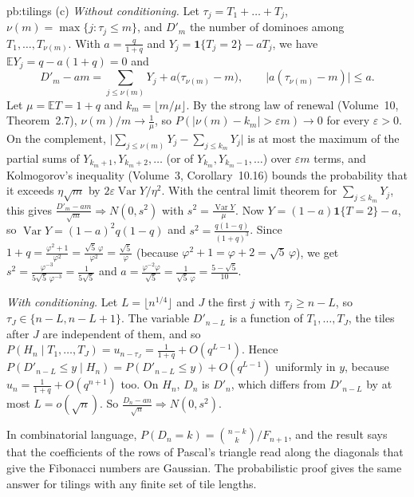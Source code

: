 \begin{solution}{pb:tilings}
(c) \emph{Without conditioning.} Let $\tau_j=T_1+\dots+T_j$, $\nu(m)=\max\{j:\tau_j\le m\}$, and $D'_m$ the number of dominoes among $T_1,\dots,T_{\nu(m)}$. With
$a=\frac q{1+q}$ and $Y_j=\mathbf 1\{T_j=2\}-aT_j$, we have $\mathbb EY_j=q-a(1+q)=0$ and
\[
D'_m-am=\sum_{j\le\nu(m)}Y_j+a\bigl(\tau_{\nu(m)}-m\bigr),\qquad\bigl|a(\tau_{\nu(m)}-m)\bigr|\le a.
\]
Let $\mu=\mathbb ET=1+q$ and $k_m=\lfloor m/\mu\rfloor$. By the strong law of renewal (Volume~10, Theorem~2.7), $\nu(m)/m\to\frac1\mu$, so $P(|\nu(m)-k_m|>\varepsilon m)\to0$
for every $\varepsilon>0$. On the complement, $\bigl|\sum_{j\le\nu(m)}Y_j-\sum_{j\le k_m}Y_j\bigr|$ is at most the maximum of the partial sums of $Y_{k_m+1},Y_{k_m+2},\dots$
(or of $Y_{k_m},Y_{k_m-1},\dots$) over $\varepsilon m$ terms, and Kolmogorov's inequality (Volume~3, Corollary~10.16) bounds the probability that it exceeds $\eta\sqrt m$ by
$2\varepsilon\operatorname{Var}Y/\eta^2$. With the central limit theorem for $\sum_{j\le k_m}Y_j$, this gives $\frac{D'_m-am}{\sqrt m}\Rightarrow N(0,s^2)$ with
$s^2=\frac{\operatorname{Var}Y}\mu$. Now $Y=(1-a)\mathbf 1\{T=2\}-a$, so $\operatorname{Var}Y=(1-a)^2q(1-q)$ and $s^2=\frac{q(1-q)}{(1+q)^3}$. Since
$1+q=\frac{\varphi^2+1}{\varphi^2}=\frac{\sqrt5\,\varphi}{\varphi^2}=\frac{\sqrt5}\varphi$ (because $\varphi^2+1=\varphi+2=\sqrt5\,\varphi$), we get
$s^2=\frac{\varphi^{-3}}{5\sqrt5\,\varphi^{-3}}=\frac1{5\sqrt5}$ and $a=\frac{\varphi^{-2}\varphi}{\sqrt5}=\frac1{\sqrt5\,\varphi}=\frac{5-\sqrt5}{10}$.

\emph{With conditioning.} Let $L=\lfloor n^{1/4}\rfloor$ and $J$ the first $j$ with $\tau_j\ge n-L$, so $\tau_J\in\{n-L,n-L+1\}$. The variable $D'_{n-L}$ is a function of
$T_1,\dots,T_J$, the tiles after $J$ are independent of them, and so $P(H_n\mid T_1,\dots,T_J)=u_{n-\tau_J}=\frac1{1+q}+O(q^{L-1})$. Hence
$P(D'_{n-L}\le y\mid H_n)=P(D'_{n-L}\le y)+O(q^{L-1})$ uniformly in $y$, because $u_n=\frac1{1+q}+O(q^{n+1})$ too. On $H_n$, $D_n$ is $D'_n$, which differs from $D'_{n-L}$ by
at most $L=o(\sqrt n)$. So $\frac{D_n-an}{\sqrt n}\Rightarrow N(0,s^2)$.

\leads In combinatorial language, $P(D_n=k)=\binom{n-k}k/F_{n+1}$, and the result says that the coefficients of the rows of Pascal's triangle read along the
diagonals that give the Fibonacci numbers are Gaussian. The probabilistic proof gives the same answer for tilings with any finite set of tile lengths.
\end{solution}

